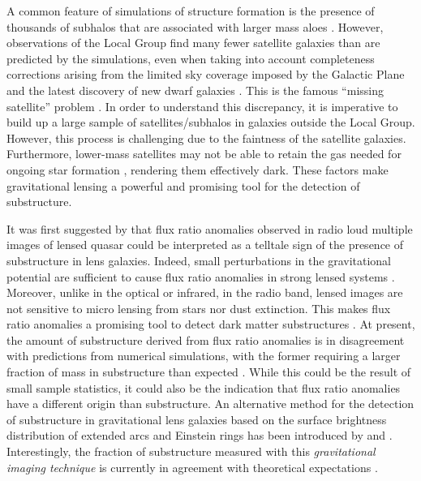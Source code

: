 \documentclass[useAMS,usenatbib]{mn2e}
\begin{document}
A common feature of simulations of structure formation is the presence
of thousands of subhalos that are associated with larger mass aloes \citep[e.g.][]{Springel08}.
However, observations of the Local Group find many fewer satellite
galaxies than are predicted by the simulations, even when taking into
account completeness corrections arising from the limited sky coverage
imposed by the Galactic Plane and the latest discovery of new dwarf galaxies \citep{DES15,Kop15}.  
This is the famous ``missing satellite'' problem \citep{Klypin1999, Moore1999, S07}. In order to
understand this discrepancy, it is imperative to build up a large
sample of satellites/subhalos in galaxies outside the Local Group.
 However, this process is challenging due to the faintness of the satellite
galaxies.  Furthermore, lower-mass satellites may not be able to
retain the gas needed for ongoing star formation \citep[e.g.,][]{P11},
rendering them effectively dark.  These factors make gravitational
lensing a powerful and promising tool for the detection of
substructure.

It was first suggested by \citet{Mao1998} that flux ratio anomalies
observed in radio loud multiple images of lensed quasar could be
interpreted as a telltale sign of the presence of substructure in lens
galaxies.  Indeed, small perturbations in the gravitational potential
are sufficient to cause flux ratio anomalies in strong lensed systems
\citep{Bradac02}.  Moreover, unlike in the optical or infrared, in the
radio band, lensed images are not sensitive to micro lensing from
stars nor dust extinction. This makes flux ratio anomalies a promising
tool to detect dark matter substructures \citep{Dalal2002, N13}.  At
present, the amount of substructure derived from flux ratio anomalies
is in disagreement with predictions from numerical simulations, with
the former requiring a larger fraction of mass in substructure than
expected \citep{Xu14}. While this could be the result of small sample
statistics, it could also be the indication that flux ratio anomalies
have a different origin than substructure.
%
An alternative method for
the detection of substructure in gravitational lens galaxies based on
the surface brightness distribution of extended arcs and Einstein rings
has been introduced by \citet{K05} and \citet{V09}. Interestingly, the fraction of
substructure measured with this \emph{gravitational imaging technique}
is currently in agreement with theoretical expectations \citep{V14a}.
\end{document}
